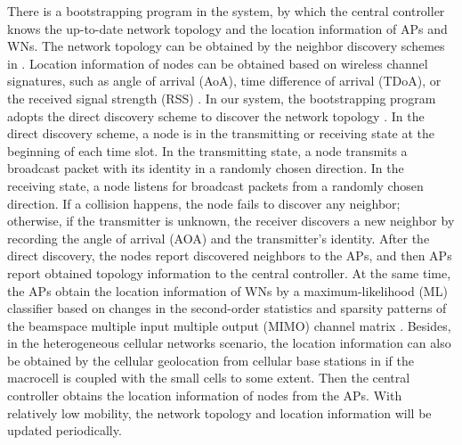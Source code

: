 \documentclass[journal]{IEEEtran}
\begin{document}
There is a bootstrapping program in the system, by which the central controller knows the up-to-date network topology and the location information of APs and WNs. The network topology can be obtained by the neighbor discovery schemes in \cite{bootstrapping,neighbor discovery,neighbor discovery 2,neighbor discovery 3,neighbor discovery 4}. Location information of nodes can be obtained based on wireless channel signatures, such as angle of arrival (AoA), time difference of arrival (TDoA), or the received signal strength (RSS) \cite{location_1, location_2, location_3, location_4, location_5}. In our system, the bootstrapping program adopts the direct discovery scheme to discover the network topology \cite{bootstrapping}. In the direct discovery scheme, a node is in the transmitting or receiving state at the beginning of each time slot. In the transmitting state, a node transmits a broadcast packet with its identity in a randomly chosen direction. In the receiving state, a node listens for broadcast packets from a randomly chosen direction. If a collision happens, the node fails to discover any neighbor; otherwise, if the transmitter is unknown, the receiver discovers a new neighbor by recording the angle of arrival (AOA) and the transmitter's identity. After the direct discovery, the nodes report discovered neighbors to the APs, and then APs report obtained topology information to the central controller. At the same time, the APs obtain the location information of WNs by a maximum-likelihood (ML) classifier based on changes in the second-order statistics and sparsity patterns of the beamspace multiple input multiple output (MIMO) channel matrix \cite{location_1}. Besides, in the heterogeneous cellular networks scenario, the location information can also be obtained by the cellular geolocation from cellular base stations in \cite{location_2} if the macrocell is coupled with the small cells to some extent. Then the central controller obtains the location information of nodes from the APs. With relatively low mobility, the network topology and location information will be updated periodically.
\end{document}
